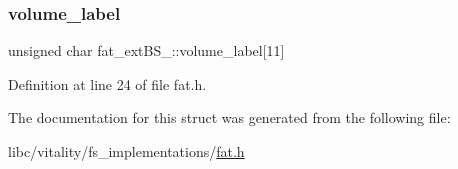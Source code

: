 \subsubsection{\texorpdfstring{volume\+\_\+label}{volume\_label}}
{\footnotesize\ttfamily unsigned char fat\+\_\+ext\+B\+S\+\_\+::volume\+\_\+label\mbox{[}11\mbox{]}}



Definition at line 24 of file fat.\+h.



The documentation for this struct was generated from the following file\+:\begin{DoxyCompactItemize}
\item 
libc/vitality/fs\+\_\+implementations/\hyperlink{a00152}{fat.\+h}\end{DoxyCompactItemize}
